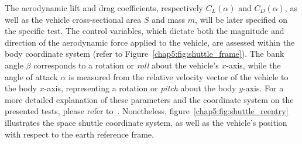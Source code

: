 %
The aerodynamic lift and drag coefficients, respectively $C_L(\alpha)$ and $C_D(\alpha)$, as well as the vehicle cross-sectional area $S$ and mass $m$, will be later specified on the specific test. The control variables, which dictate both the magnitude and direction of the aerodynamic force applied to the vehicle, are assessed within the body coordinate system (refer to Figure~\ref{chap5:fig:shuttle_frame}). The bank angle $\beta$ corresponds to a rotation or \emph{roll} about the vehicle's $x$-axis, while the angle of attack $\alpha$ is measured from the relative velocity vector of the vehicle to the body $x$-axis, representing a rotation or \emph{pitch} about the body $y$-axis. For a more detailed explanation of these parameters and the coordinate system on the presented tests, please refer to~\cite{brenan1983stability}. Nonetheless, figure~\ref{chap5:fig:shuttle_reentry} illustrates the space shuttle coordinate system, as well as the vehicle's position with respect to the earth reference frame.

